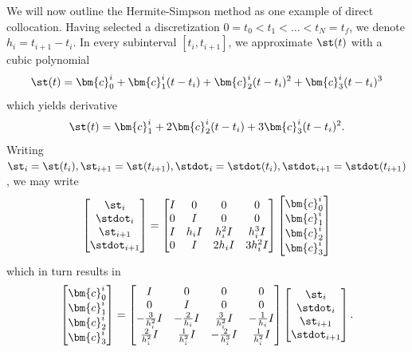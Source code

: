 We will now outline the Hermite-Simpson method as one example of direct collocation. Having selected a discretization $0 = t_0 < t_1 < \ldots < t_N = t_f$, we denote $h_i = t_{i+1} - t_i$. In every subinterval $[t_i, t_{i+1}]$, we approximate $\st(t)$ with a cubic polynomial
\begin{equation}
    \st(t) = \bm{c}_0^i + \bm{c}_1^i (t - t_i) + \bm{c}_2^i (t-t_i)^2 + \bm{c}_3^i (t - t_i)^3 
\end{equation}
which yields derivative 
\begin{equation}
    \st(t) = \bm{c}_1^i + 2 \bm{c}_2^i (t-t_i) + 3 \bm{c}_3^i (t - t_i)^2. 
\end{equation}
Writing $\st_i = \st(t_i), \st_{i+1} = \st(t_{i+1}), \stdot_i = \stdot(t_i), \stdot_{i+1} = \stdot(t_{i+1})$, we may write 
\begin{equation}
    \begin{bmatrix}
    \st_i\\
    \stdot_{i}\\
    \st_{i+1}\\
    \stdot_{i+1}
\end{bmatrix}
=
\begin{bmatrix}
I & 0 & 0 & 0\\
0 & I & 0 & 0\\
I & h_i I & h_i^2 I & h_i^3 I\\
0 &  I & 2 h_i I & 3 h_i^2 I
\end{bmatrix}
    \begin{bmatrix}
    \bm{c}_0^i\\
    \bm{c}_1^i\\
    \bm{c}_2^i\\
    \bm{c}_3^i
\end{bmatrix}
\end{equation}
which in turn results in 
\begin{equation}
\begin{bmatrix}
    \bm{c}_0^i\\
    \bm{c}_1^i\\
    \bm{c}_2^i\\
    \bm{c}_3^i
\end{bmatrix}
=
\begin{bmatrix}
I & 0 & 0 & 0\\
0 & I & 0 & 0\\
-\frac{3}{h_i^2} I & -\frac{2}{h_i} I & \frac{3}{h_i^2} I & -\frac{1}{h_i} I\\
\frac{2}{h_i^2} I & \frac{1}{h_i^2} I & -\frac{2}{h_i^3} I & \frac{1}{h_i^2} I
\end{bmatrix}
\begin{bmatrix}
    \st_i\\
    \stdot_{i}\\
    \st_{i+1}\\
    \stdot_{i+1}
\end{bmatrix}.
\end{equation}
